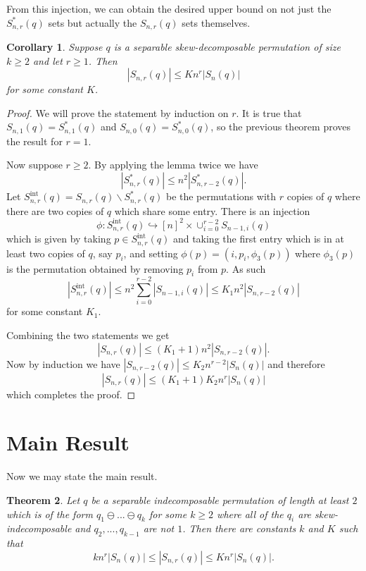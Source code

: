 \documentclass[11pt, final]{amsart}
\newtheorem{theorem}{Theorem}[section]								\newtheorem{proposition}[theorem]{Proposition}
\newtheorem{corollary}[theorem]{Corollary}
\theoremstyle{remark}
\numberwithin{equation}{section}
\begin{document}
From this injection, we can obtain the desired upper bound on not just the $S^*_{n,r}(q)$ sets but actually the $S_{n,r}(q)$ sets themselves.
\begin{corollary}
    Suppose $q$ is a separable skew-decomposable permutation of size $k\geq 2$ and let $r\geq 1$. Then
    \[
    |S_{n,r}(q)| \leq Kn^r |S_{n}(q)|
    \]
    for some constant $K$.
\end{corollary}

\begin{proof}
    We will prove the statement by induction on $r$. It is true that $S_{n,1}(q) = S_{n,1}^*(q)$ and $S_{n,0}(q) = S_{n,0}^*(q)$, so the previous theorem proves the result for $r = 1$.

    Now suppose $r\geq 2$. By applying the lemma twice we have
    \[
    |S_{n,r}^*(q)| \leq n^2 |S_{n,r-2}^*(q)|.
    \]
    Let $S_{n,r}^{\text{int}}(q) = S_{n,r}(q) \backslash S_{n,r}^*(q)$ be the permutations with $r$ copies of $q$ where there are two copies of $q$ which share some entry. There is an injection
    \[
    \phi: S_{n,r}^{\text{int}}(q) \hookrightarrow [n]^2 \times \cup_{i=0}^{r-2} S_{n-1,i}(q)
    \]
    which is given by taking $p\in S_{n,r}^{\text{int}}(q)$ and taking the first entry which is in at least two copies of $q$, say $p_i$, and setting $\phi(p) = (i,p_i, \phi_3(p))$ where $\phi_3(p)$ is the permutation obtained by removing $p_i$ from $p$. As such
    \[
    |S_{n,r}^{\text{int}}(q)| \leq n^2 \sum_{i=0}^{r-2} |S_{n-1,i}(q)| \leq K_1 n^2 |S_{n,r-2}(q)|
    \]
    for some constant $K_1$.

    Combining the two statements we get
    \[
    |S_{n,r}(q)| \leq (K_1 + 1) n^2 |S_{n,r-2}(q)|.
    \]
    Now by induction we have $|S_{n,r-2}(q)| \leq K_2 n^{r-2} |S_n(q)|$ and therefore
    \[
    |S_{n,r}(q)| \leq (K_1 + 1) K_2 n^r |S_{n}(q)|
    \]
    which completes the proof.
\end{proof}

\section{Main Result}
Now we may state the main result.
\begin{theorem}
    Let $q$ be a separable indecomposable permutation of length at least $2$ which is of the form $q_1 \ominus ... \ominus q_k$ for some $k \geq 2$ where all of the $q_i$ are skew-indecomposable and $q_2, ..., q_{k-1}$ are not $1$. Then there are constants $k$ and $K$ such that
    \[
    kn^r|S_{n}(q)| \leq |S_{n,r}(q)| \leq Kn^r|S_{n}(q)|.
    \]
\end{theorem}
\end{document}
